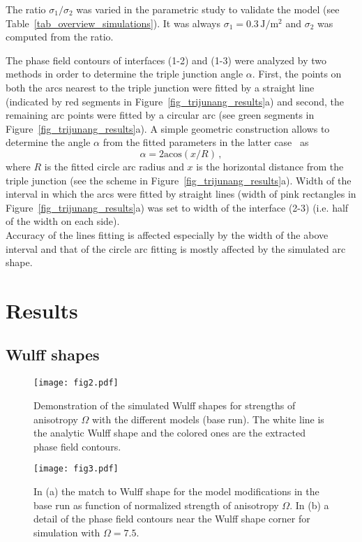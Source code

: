 The ratio $\sigma_1/\sigma_2$ was varied in the parametric study to validate the model (see Table~\ref{tab_overview_simulations}). It was always $\sigma_1=0.3\,\mathrm{J/m^2}$ and $\sigma_2$ was computed from the ratio.

The phase field contours of interfaces (1-2) and (1-3) were analyzed by two methods in order to determine the triple junction angle $\alpha$. First, the points on both the arcs nearest to the triple junction were fitted by a straight line (indicated by red segments in Figure~\ref{fig_trijunang_results}a) and second, the remaining arc points were fitted by a circular arc (see green segments in Figure~\ref{fig_trijunang_results}a). A simple geometric construction allows to determine the angle $\alpha$ from the fitted parameters in the latter case~\cite{Moelans2009} as
\begin{equation}
	\alpha = 2\mathrm{acos}(x/R)\,,
\end{equation}
where $R$ is the fitted circle arc radius and $x$ is the horizontal distance from the triple junction (see the scheme in Figure~\ref{fig_trijunang_results}a). Width of the interval in which the arcs were fitted by straight lines (width of pink rectangles in Figure~\ref{fig_trijunang_results}a) was set to width of the interface (2-3) (i.e. half of the width on each side).\\
Accuracy of the lines fitting is affected especially by the width of the above interval and that of the circle arc fitting is mostly affected by the simulated arc shape.

\section{Results}
\label{sec_Results}

\subsection{Wulff shapes}
\begin{figure}
	\centering
	\texttt{[image: fig2.pdf]}
	\caption[Demonstration of the simulated Wulff shapes]{Demonstration of the simulated Wulff shapes for strengths of anisotropy $\Omega$ with the different models (base run). The white line is the analytic Wulff shape and the colored ones are the extracted phase field contours.}
	\label{fig_wulff_demo_shapes}
\end{figure}

\begin{figure}[]
	\centering
	\texttt{[image: fig3.pdf]}
	\caption[Quantified match to the Wulff shape for the model modifications in the base run]{In (a) the match to Wulff shape for the model modifications in the base run as function of normalized strength of anisotropy $\Omega$. In (b) a detail of the phase field contours near  the Wulff shape corner for simulation with $\Omega=7.5$.}
	\label{fig_wulff_match}
\end{figure}

